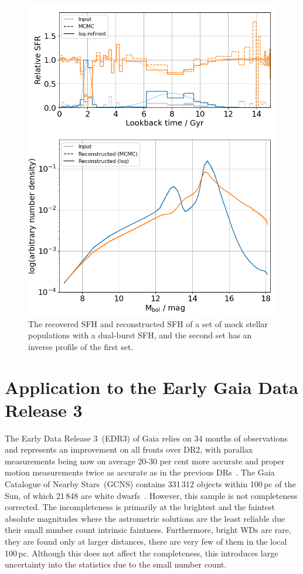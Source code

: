 \documentclass[fleqn,usenatbib]{mnras}
\begin{document}
\begin{figure}
  \includegraphics[width=\columnwidth]{figures/fig_02_two_bursts_wdlf.png} 
  \caption{The recovered SFH and reconstructed SFH of a set of mock stellar populations with a dual-burst SFH, and the second set has an inverse profile of the first set.}
  \label{fig:dual_burst_sfh}
\end{figure}


\section{Application to the Early Gaia Data Release 3}
The Early Data Release 3~(EDR3) of Gaia relies on 34 months of
observations and represents an improvement on all fronts over DR2,
with parallax measurements being now on average 20-30 per cent more
accurate and proper motion measurements twice as accurate as in the
previous DRs~\citep{2021A&A...649A...1G, 2021A&A...649A...2L}.
The Gaia Catalogue of Nearby Stars~(GCNS) contains 331\,312 objects within
100\,pc of the Sun, of which 21\,848 are white dwarfs~\citep{2021A&A...649A...6G}. 
However, this sample is not completeness corrected. The incompleteness
is primarily at the brightest and the faintest absolute magnitudes
where the astrometric solutions are the least reliable due their
small number count intrinsic faintness. Furthermore, bright WDs are rare,
they are found only at larger distances, there are very few of them in
the local 100\,pc. Although this does not affect the completeness, this
introduces large uncertainty into the statistics due to the small
number count.
\end{document}
